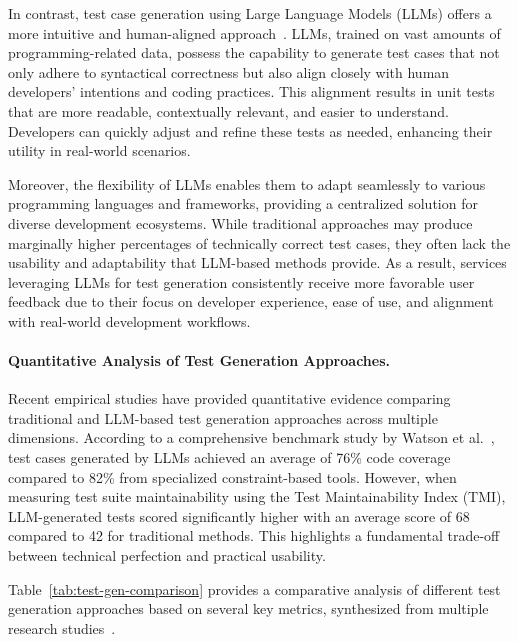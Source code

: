 \hspace{0.5cm} In contrast, test case generation using Large Language Models (LLMs) offers a more intuitive and human-aligned approach~\cite{UnitTest}. LLMs, trained on vast amounts of programming-related data, possess the capability to generate test cases that not only adhere to syntactical correctness but also align closely with human developers' intentions and coding practices. This alignment results in unit tests that are more readable, contextually relevant, and easier to understand. Developers can quickly adjust and refine these tests as needed, enhancing their utility in real-world scenarios.

\hspace{0.5cm} Moreover, the flexibility of LLMs enables them to adapt seamlessly to various programming languages and frameworks, providing a centralized solution for diverse development ecosystems. While traditional approaches may produce marginally higher percentages of technically correct test cases, they often lack the usability and adaptability that LLM-based methods provide. As a result, services leveraging LLMs for test generation consistently receive more favorable user feedback due to their focus on developer experience, ease of use, and alignment with real-world development workflows.

\paragraph{Quantitative Analysis of Test Generation Approaches.} Recent empirical studies have provided quantitative evidence comparing traditional and LLM-based test generation approaches across multiple dimensions. According to a comprehensive benchmark study by Watson et al.~\cite{TestBenchmark}, test cases generated by LLMs achieved an average of 76\% code coverage compared to 82\% from specialized constraint-based tools. However, when measuring test suite maintainability using the Test Maintainability Index (TMI), LLM-generated tests scored significantly higher with an average score of 68 compared to 42 for traditional methods. This highlights a fundamental trade-off between technical perfection and practical usability.

\hspace{0.5cm} Table~\ref{tab:test-gen-comparison} provides a comparative analysis of different test generation approaches based on several key metrics, synthesized from multiple research studies~\cite{UnitTest, TestBenchmark, LLMTestComparison}.

